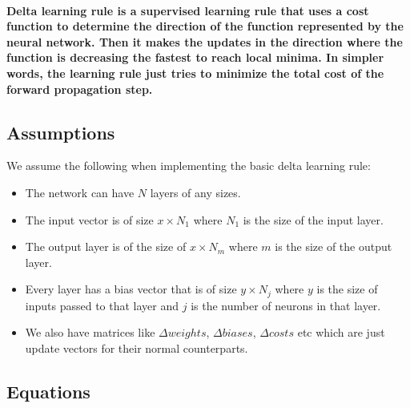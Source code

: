 \documentclass[../main.tex]{subfiles}
\begin{document}
\paragraph{Delta learning rule is a supervised learning rule that uses a cost function to determine the direction of the function represented by the neural network. Then it makes the updates in the direction where the function is decreasing the fastest to reach local minima. In simpler words, the learning rule just tries to minimize the total cost of the forward propagation step.}

\subsection{Assumptions}
We assume the following when implementing the basic delta learning rule:
\begin{itemize}
  \item The network can have $N$ layers of any sizes.
  \item The input vector is of size $x \times N_1$ where $N_1$ is the size of the input layer.
  \item The output layer is of the size of $x \times N_m$ where $m$ is the size of the output layer.
  \item Every layer has a bias vector that is of size $y \times N_j$ where $y$ is the size of inputs passed to that layer and $j$ is the number of neurons in that layer.
  \item We also have matrices like $\Delta weights$, $\Delta biases$, $\Delta costs$ etc which are just update vectors for their normal counterparts.
\end{itemize}

\subsection{Equations}
\end{document}
